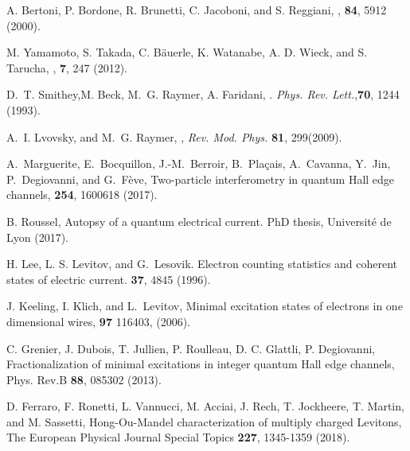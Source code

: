 \documentclass[aps,prb,superscriptaddress,preprint]{revtex4-1}
\begin{document}
\begin{thebibliography}{1}
		A. Bertoni, P. Bordone, R. Brunetti, C. Jacoboni, and
		S. Reggiani, ,   {\bf 84}, 5912 (2000).
		
		M. Yamamoto, S. Takada, C. B\"{a}uerle, K. Watanabe, A. D. Wieck, and S. Tarucha,
		,
		 {\bf 7}, 247 (2012).
		
		
		D.~T. Smithey,M. Beck, M.~G. Raymer, A. Faridani,
		.
		\emph{Phys. Rev. Lett.},\textbf{70}, 1244 (1993).
		
		A.~I. Lvovsky, and  M.~G. Raymer,
		,
		\emph{Rev. Mod. Phys.} \textbf{81},
		299(2009).
		
		A.~Marguerite, E.~Bocquillon, J.-M.~Berroir, B.~Pla\c{c}ais, A.~Cavanna, Y.~Jin, P.~Degiovanni, and G.~F{\`e}ve,
		\newblock Two-particle interferometry in quantum Hall edge channels,  {\bf 254}, 1600618 (2017).
		
		B. Roussel, Autopsy of a quantum electrical current.
		PhD thesis, Universit\'{e} de Lyon (2017).
		
		H. Lee, L. S. Levitov, and G.~Lesovik.
		\newblock Electron counting statistics and coherent states of electric current.
		  {\bf 37}, 4845 (1996).
		
		J. Keeling, I. Klich, and L.~Levitov,
		\newblock Minimal excitation states of electrons in one dimensional wires,
		  {\bf 97} 116403, (2006).
		
		C. Grenier, J. Dubois, T. Jullien, P. Roulleau, D. C. Glattli, P. Degiovanni, Fractionalization of minimal excitations in integer quantum Hall edge channels, Phys. Rev.B {\bf 88}, 085302 (2013).
		
		
		
		D. Ferraro, F. Ronetti, L. Vannucci, M. Acciai, J. Rech, T. Jockheere, T. Martin, and M. Sassetti, Hong-Ou-Mandel characterization of multiply charged Levitons, The European Physical Journal Special Topics {\bf 227}, 1345-1359 (2018).
		

\end{thebibliography}
\end{document}
